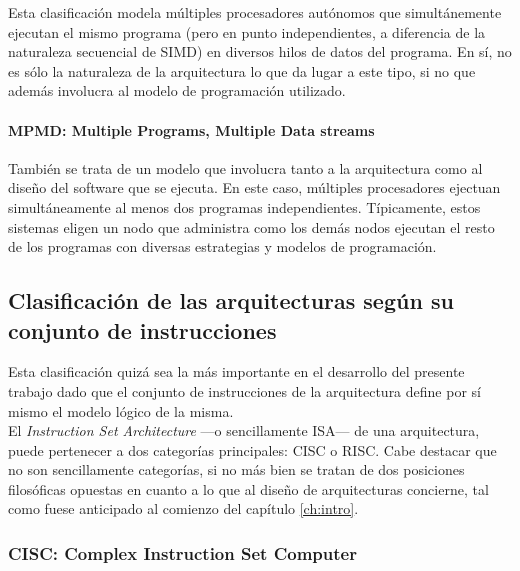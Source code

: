 Esta clasificación modela múltiples procesadores autónomos que simultánemente 
ejecutan el mismo programa (pero en punto independientes, a diferencia de la 
naturaleza secuencial de SIMD) en diversos hilos de datos del programa. En sí, 
no es sólo la naturaleza de la arquitectura lo que da lugar a este tipo, si no 
que además involucra al modelo de programación utilizado.

\paragraph{MPMD: Multiple Programs, Multiple Data streams}
\label{par:theory-modern-flynn_taxonomy-today-MPMD}

También se trata de un modelo que involucra tanto a la arquitectura como al 
diseño del software que se ejecuta. En este caso, múltiples procesadores 
ejectuan simultáneamente al menos dos programas independientes. Típicamente, 
estos sistemas eligen un nodo que administra como los demás nodos ejecutan el 
resto de los programas con diversas estrategias y modelos de programación.

\subsection{Clasificación de las arquitecturas según su conjunto de 
instrucciones}
\label{subsec:theory-modern-isa_class}

Esta clasificación quizá sea la más importante en el desarrollo del presente 
trabajo dado que el conjunto de instrucciones de la arquitectura define por sí 
mismo el modelo lógico de la misma.\\
El \emph{Instruction Set Architecture} ---o sencillamente ISA--- de una 
arquitectura, puede pertenecer a dos categorías principales: CISC o RISC. Cabe 
destacar que no son sencillamente categorías, si no más bien se tratan de dos 
posiciones filosóficas opuestas en cuanto a lo que al diseño de arquitecturas 
concierne, tal como fuese anticipado al comienzo del capítulo \ref{ch:intro}.

\subsubsection{CISC: Complex Instruction Set Computer}
\label{subsubsec:theory-modern-isa_class-cisc}

